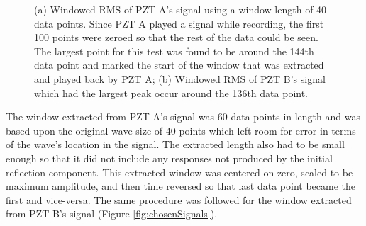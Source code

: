 \begin{figure}
\begin{subfigmatrix}{2}
\end{subfigmatrix}

  \caption
  { \label{fig:windowedRMS}
(a) Windowed RMS of PZT A's signal using a window length of 40 data points. Since PZT A played a signal while recording, the first 100 points were zeroed so that the rest of the data could be seen. The largest point for this test was found to be around the 144th data point and marked the start of the window that was extracted and played back by PZT A;
(b) Windowed RMS of PZT B's signal which had the largest peak occur around the 136th data point.
}
\end{figure}

The window extracted from PZT A's signal was 60 data points in length and was based upon the original wave size of 40 points which left room for error in terms of the wave's location in the signal. The extracted length also had to be small enough so that it did not include any responses not produced by the initial reflection component. This extracted window was centered on zero, scaled to be maximum amplitude, and then time reversed so that last data point became the first and vice-versa. The same procedure was followed for the window extracted from PZT B's signal (Figure \ref{fig:chosenSignals}).

